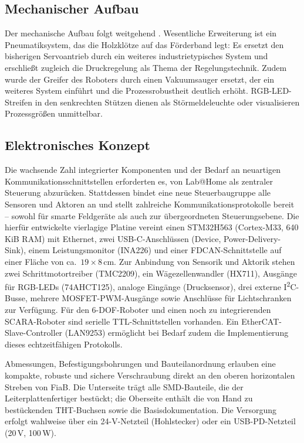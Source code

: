 \documentclass[]{article}%
\begin{document}
\subsection{Mechanischer Aufbau}
Der mechanische Aufbau folgt weitgehend \cite{liebler2025}. Wesentliche Erweiterung ist ein Pneumatiksystem, das die Holzklötze auf das Förderband legt: Es ersetzt den bisherigen Servoantrieb durch ein weiteres industrietypisches System und erschließt zugleich die Druckregelung als Thema der Regelungstechnik. Zudem wurde der Greifer des Roboters durch einen Vakuumsauger ersetzt, der ein weiteres System einführt und die Prozessrobustheit deutlich erhöht. RGB-LED-Streifen in den senkrechten Stützen dienen als Störmeldeleuchte oder visualisieren Prozessgrößen unmittelbar.

\subsection{Elektronisches Konzept}
Die wachsende Zahl integrierter Komponenten und der Bedarf an neuartigen Kommunikationsschnittstellen erforderten es, von Lab@Home \cite{liebler2023} als zentraler Steuerung abzurücken. Stattdessen bindet eine neue Steuerbaugruppe alle Sensoren und Aktoren an und stellt zahlreiche Kommunikationsprotokolle bereit -- sowohl für smarte Feldgeräte als auch zur übergeordneten Steuerungsebene. Die hierfür entwickelte vierlagige Platine vereint einen STM32H563 (Cortex-M33, 640\,KiB RAM) mit Ethernet, zwei USB-C-Anschlüssen (Device, Power-Delivery-Sink), einem Leistungsmonitor (INA226) und einer FDCAN-Schnittstelle auf einer Fläche von ca.~$19 \times 8$\,cm. Zur Anbindung von Sensorik und Aktorik stehen zwei Schrittmotortreiber (TMC2209), ein Wägezellenwandler (HX711), Ausgänge für RGB-LEDs (74AHCT125), analoge Eingänge (Drucksensor), drei externe I\textsuperscript{2}C-Busse, mehrere MOSFET-PWM-Ausgänge sowie Anschlüsse für Lichtschranken zur Verfügung. Für den 6-DOF-Roboter und einen noch zu integrierenden SCARA-Roboter sind serielle TTL-Schnittstellen vorhanden. Ein EtherCAT-Slave-Controller (LAN9253) ermöglicht bei Bedarf zudem die Implementierung dieses echtzeitfähigen Protokolls.

Abmessungen, Befestigungsbohrungen und Bauteilanordnung erlauben eine kompakte, robuste und sichere Verschraubung direkt an den oberen horizontalen Streben von FiaB. Die Unterseite trägt alle SMD-Bauteile, die der Leiterplattenfertiger bestückt; die Oberseite enthält die von Hand zu bestückenden THT-Buchsen sowie die Basisdokumentation. Die Versorgung erfolgt wahlweise über ein 24-V-Netzteil (Hohlstecker) oder ein USB-PD-Netzteil (20\,V, 100\,W).
\end{document}
